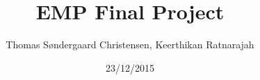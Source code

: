 \documentclass[a4paper,10pt]{article}
\title{EMP Final Project}
\author{Thomas Søndergaard Christensen, Keerthikan Ratnarajah}
\date{23/12/2015}
\begin{document}


\newpage
\tableofcontents
\newpage
\listoffigures
\listoftables
\listoftodos
\clearpage
\newpage



%
%
\newpage

\end{document}
